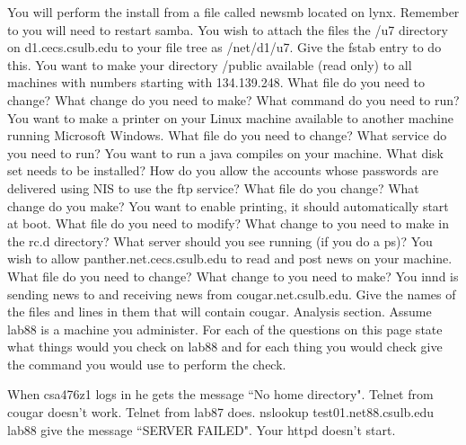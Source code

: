 You will perform the install from a file called {\ltt{}newsmb}
located on {\ltt{}lynx}.
Remember to you will need to restart samba.
\vskip 2.4in
\ques
You wish to attach the files the
{\ltt{}/u7} directory on {\ltt{}d1.cecs.csulb.edu}
to your file tree as {\ltt{}/net/d1/u7}.
Give the {\ltt{}fstab} entry to do this.
\vskip 0.9in
\ques
You want to make your directory 
{\ltt{}/public}
available (read only) to all machines with numbers starting with 134.139.248.
What file do you need to change?
What change do you need to make?
What command do you need to run?
\vskip 1.6in
\ques
You want to make a printer on your
Linux machine available to another machine running Microsoft Windows. 
What file do you need to change?
What service do you need to run?
\vskip 1.2in
\vfill\eject
\ques
You want to run a java compiles on your machine.
What disk set needs to be installed?
\vskip 0.6in
\ques
How do you allow the accounts whose passwords are delivered
using NIS to use the ftp service?
What file do you change? What change do you make?
\vskip 1.4in
\ques
You want to enable printing, it should automatically start at boot.
What file do you need to modify?
What change to you need to make in the {\ltt{}rc.d} directory?
What server should you see running (if you do a ps)?
\vskip 1.6in
\ques
You wish to allow {\ltt{}panther.net.cecs.csulb.edu} to read
and post news on your machine.
What file do you need to change?
What change to you need to make?
\vskip 1.4in
\ques
You {\ltt{}innd} is sending news to and receiving news from
{\ltt{}cougar.net.csulb.edu}.
Give the names of the files and lines in them that
will contain {\ltt{}cougar}.
\vskip 2.2in
\vfill\eject
Analysis section. Assume {\ltt{}lab88} is a machine you administer.
For each of the questions on this page
state what things would you check on {\ltt{}lab88}
and for each thing you would check give the command you would use to
perform the check.

\ques
When {\ltt{}csa476z1} logs in he gets the
message ``No home directory". 
\vfill
\ques
Telnet from {\ltt{}cougar} doesn't work.
Telnet from {\ltt{}lab87} does.
\vfill
\ques
{\ltt{}nslookup test01.net88.csulb.edu lab88}
give the message ``{\ltt{}SERVER FAILED}".
\vfill
\ques
Your {\ltt{}httpd} doesn't start.
\bye
